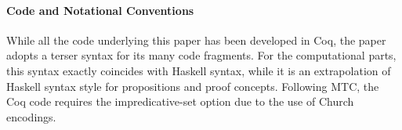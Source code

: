 \paragraph{Code and Notational Conventions}

While all the code underlying this paper has been developed in Coq,
the paper adopts a terser syntax for its many code fragments.  For the
computational parts, this syntax exactly coincides with Haskell
syntax, while it is an extrapolation of Haskell syntax style for
propositions and proof concepts. Following MTC, the Coq code requires the
impredicative-set option due to the use of Church encodings.

